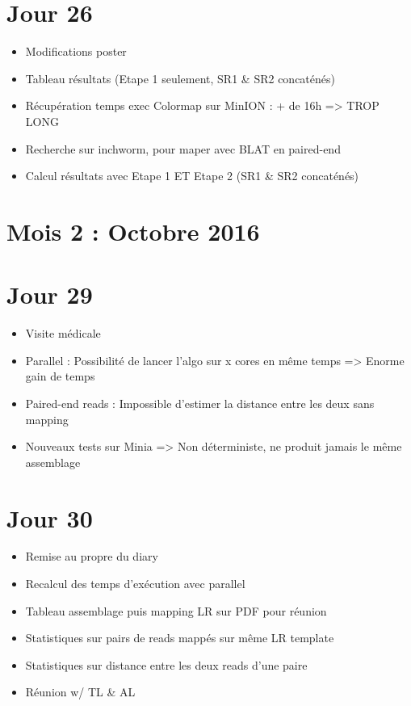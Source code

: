 \documentclass[12pt]{report}
\begin{document}
\section{Jour 26}

\begin{itemize}
  \item Modifications poster

  \item Tableau résultats (Etape 1 seulement, SR1 \& SR2 concaténés)

  \item Récupération temps exec Colormap sur MinION : + de 16h => TROP LONG

  \item Recherche sur inchworm, pour maper avec BLAT en paired-end

  \item Calcul résultats avec Etape 1 ET Etape 2 (SR1 \& SR2 concaténés)
\end{itemize}

\section {Mois 2 : Octobre 2016}

\section{Jour 29}

\begin{itemize}
  \item Visite médicale

  \item Parallel : Possibilité de lancer l'algo sur x cores en même temps => Enorme gain de temps

  \item Paired-end reads : Impossible d'estimer la distance entre les deux sans mapping

  \item Nouveaux tests sur Minia => Non déterministe, ne produit jamais le même assemblage
\end{itemize}

\section{Jour 30}

\begin{itemize}
  \item Remise au propre du diary

  \item Recalcul des temps d'exécution avec parallel
	
	\item Tableau assemblage puis mapping LR sur PDF pour réunion
	
	\item Statistiques sur pairs de reads mappés sur même LR template
	
	\item Statistiques sur distance entre les deux reads d'une paire
	
	\item Réunion w/ TL \& AL
\end{itemize}
\end{document}
